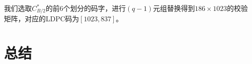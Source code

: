 \documentclass[lang=cn,11pt,a4paper,numbers]{elegantpaper}
\begin{document}
我们选取$C_{B/2}^{*}$的前6个划分的码字，进行$(q-1)$元组替换得到$186\times 1023$的校验矩阵，对应的LDPC码为$[1023, 837]$。

\section{总结}













\end{document}
